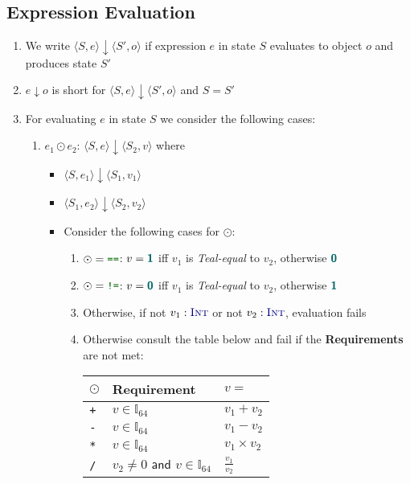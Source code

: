 \documentclass{article}
\newcommand{\tuple}[1]{\ensuremath{\langle #1 \rangle}}
\newcommand{\vterminal}[1]{\textsf{\textcolor{dgreen}{\texttt{#1}}}}
\newcommand{\Ty}[1]{\textcolor{dblue}{#1}}
\newcommand{\TInt}{\Ty{\textsc{Int}}}
\newcommand{\Vint}[1]{{\textsf{\textcolor{dcyan}{\textbf{#1}}}}}
\newcommand{\fail}{\textcolor{dred}{fail}}
\begin{document}
\subsection{Expression Evaluation}
\begin{enumerate}
\item We write $\tuple{S,e} \downarrow \tuple{S',o}$ if expression $e$ in state $S$ evaluates to object $o$ and produces state $S'$
\item $e \downarrow o$ is short for $\tuple{S,e} \downarrow \tuple{S',o}$ and $S = S'$
\item For evaluating $e$ in state $S$ we consider the following cases:
  \begin{enumerate}
  \item \vterminal{$e_1 \odot e_2$}: $\tuple{S, e} \downarrow \tuple{S_2, v}$ where
    \begin{itemize}
      \item $\tuple{S, e_1} \downarrow \tuple{S_1, v_1}$
      \item $\tuple{S_1, e_2} \downarrow \tuple{S_2, v_2}$
      \item Consider the following cases for $\odot$:
        \begin{enumerate}
          \item $\odot = \vterminal{==}$: $v = \Vint{1}$ iff $v_1$ is \emph{Teal-equal} to $v_2$, otherwise $\Vint{0}$
          \item $\odot = \vterminal{!=}$: $v = \Vint{0}$ iff $v_1$ is \emph{Teal-equal} to $v_2$, otherwise $\Vint{1}$
          \item Otherwise, if not $v_1 : \TInt$ or not $v_2 : \TInt$, evaluation \fail{}s
          \item Otherwise consult the table below and \fail{} if the \textbf{Requirements} are not met:\\
            \begin{tabular}{|l|l|l|}
              \hline
              $\odot$ & \textbf{Requirement} & $v = $\\
              \hline
              \hline
              \vterminal{+}	& $v \in \mathbb{I}_{64}$			& $v_1 + v_2$ \\
              \hline
              \vterminal{-}	& $v \in \mathbb{I}_{64}$			& $v_1 - v_2$ \\
              \hline
              \vterminal{*}	& $v \in \mathbb{I}_{64}$			& $v_1 \times v_2$ \\
              \hline
              \vterminal{/}	& $v_2 \ne 0 \textsf{ and }v \in \mathbb{I}_{64}$		& $\frac{v_1}{v_2}$ \\

\end{tabular}
\end{enumerate}
\end{itemize}
\end{enumerate}
\end{enumerate}
\end{document}
